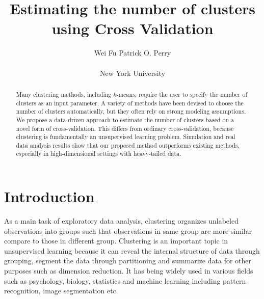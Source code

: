 \documentclass[11pt]{article}
\begin{document}
\title{Estimating the number of clusters using Cross Validation}
\author{Wei Fu \qquad Patrick O. Perry \\\\ New York University}
\date{}
\maketitle
\begin{abstract}
Many clustering methods, including $k$-means, require the user to specify the
number of clusters as an input parameter. A variety of methods have been
devised to choose the number of clusters automatically, but they often rely on
strong modeling assumptions. We propose a data-driven approach to estimate the
number of clusters based on a novel form of cross-validation. This differs
from ordinary cross-validation, because clustering is fundamentally an
unsupervised learning problem. Simulation and real data analysis results show
that our proposed method outperforms existing methods, especially in
high-dimensional settings with heavy-tailed data.
\end{abstract}


\section{Introduction}

As a main task of exploratory data analysis, clustering organizes unlabeled
observations into groups such that observations in same group are more similar
compare to those in different group. Clustering is an important topic in
unsupervised learning because it can reveal the internal structure of data
through grouping, segment the data through partitioning and summarize data for
other purposes such as dimension reduction. It has being widely used in
various fields such as psychology, biology, statistics and machine learning
including pattern recognition, image segmentation etc.
\end{document}
